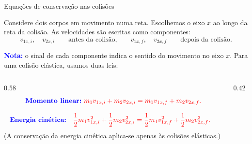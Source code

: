 \documentclass{beamer}
\begin{document}
	
	\begin{frame}{Equações de conservação nas colisões}
		\scriptsize
		
		Considere dois corpos em movimento numa reta. Escolhemos o eixo \(x\) ao longo da reta da colisão.
		As velocidades são escritas como componentes:
		\[
		v_{1x,i},\quad v_{2x,i}
		\qquad \text{antes da colisão,}
		\qquad
		v_{1x,f},\quad v_{2x,f}
		\qquad \text{depois da colisão.}
		\]
		
		\textcolor{blue}{\textbf{Nota:}}
		o sinal de cada componente indica o sentido do movimento no eixo \(x\).
		Para uma colisão elástica, usamos duas leis:
		
		\begin{columns}[T]
			\begin{column}{0.58\textwidth}
				\[
				\textcolor{blue}{\textbf{Momento linear:}\,\,}
				\textcolor{red}{
					m_1v_{1x,i}+m_2v_{2x,i}
					=
					m_1v_{1x,f}+m_2v_{2x,f}.}
				\]
				
				\[
				\begin{aligned}
					\textcolor{blue}{\textbf{Energia cinética:}}\quad
					&\textcolor{red}{
						\frac12m_1v_{1x,i}^2+\frac12m_2v_{2x,i}^2
						=
						\frac12m_1v_{1x,f}^2+\frac12m_2v_{2x,f}^2.}
				\end{aligned}
				\]
				\vspace{0.1cm}
				{(A conservação da energia cinética aplica-se apenas às colisões elásticas.)}
				
			\end{column}
			
			\begin{column}{0.42\textwidth}
\end{column}
\end{columns}
\end{frame}
\end{document}
